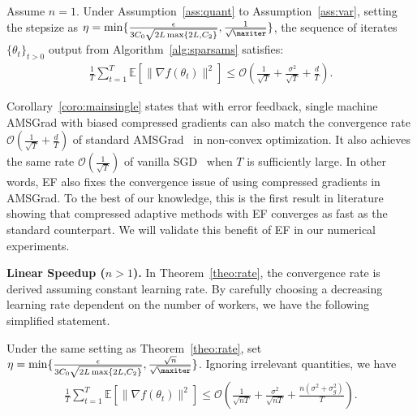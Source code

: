 \documentclass[11pt]{article}
\begin{document}
\begin{Corollary}\label{coro:mainsingle}
Assume $n=1$. Under Assumption~\ref{ass:quant} to Assumption~\ref{ass:var}, setting the stepsize as $\eta = \min\{\frac{\epsilon}{3C_0\sqrt{2L \max\{2L,C_2\}}}, \frac{1}{\sqrt{\maxiter}}\}$, the sequence of iterates $\{\theta_t\}_{t>0}$ output from Algorithm~\ref{alg:sparsams} satisfies:
\begin{align*}
    \frac{1}{T}\sum_{t=1}^T \mathbb E[\|\nabla f(\theta_t)\|^2]\leq \mathcal O(\frac{1}{\sqrt{T}}+ \frac{\sigma^2}{\sqrt T}+\frac{d}{T}).
\end{align*}
\end{Corollary}

Corollary~\ref{coro:mainsingle} states that with error feedback, single machine AMSGrad with biased compressed gradients can also match the convergence rate $\mathcal O(\frac{1}{\sqrt{T}}+\frac{d}{T})$ of standard AMSGrad~\cite{Arxiv:Zhou_18} in non-convex optimization. It also achieves the same rate $\mathcal O(\frac{1}{\sqrt T})$ of vanilla SGD~\cite{karimireddy2019error} when $T$ is sufficiently large. In other words, EF also fixes the convergence issue of using compressed gradients in AMSGrad. To the best of our knowledge, this is the first result in literature showing that compressed adaptive methods with EF converges as fast as the standard counterpart. We will validate this benefit of EF in our numerical experiments.

\textbf{Linear Speedup ($n>1$).} In Theorem~\ref{theo:rate}, the convergence rate is derived assuming constant learning rate. By carefully choosing a decreasing learning rate dependent on the number of workers, we have the following simplified statement.

\begin{Corollary}\label{coro:linear speedup}
Under the same setting as Theorem~\ref{theo:rate}, set $\eta = \min\{\frac{\epsilon}{3C_0\sqrt{2L \max\{2L,C_2\}}}, \frac{\sqrt n}{\sqrt{\maxiter}}\}$. Ignoring irrelevant quantities, we have
\begin{align}
    \frac{1}{T}\sum_{t=1}^T \mathbb E[\|\nabla f(\theta_t)\|^2]\leq \mathcal O(\frac{1}{\sqrt{nT}}+\frac{\sigma^2}{\sqrt{nT}}+\frac{n(\sigma^2+\sigma_g^2)}{T}).  \label{label:eq:linear speedup}
\end{align}
\end{Corollary}
\end{document}

